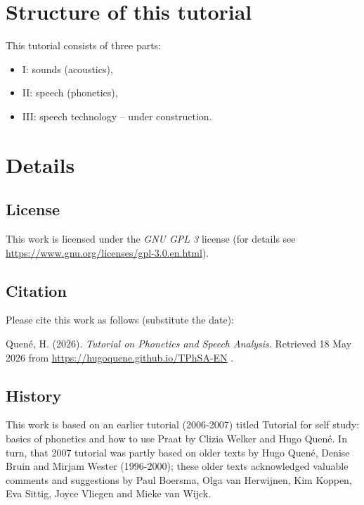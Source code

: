 \documentclass[
]{book}
\begin{document}
\section*{Structure of this tutorial}\label{structure-of-this-tutorial}

This tutorial consists of three parts:

\begin{itemize}
\item
  I: sounds (acoustics),
\item
  II: speech (phonetics),
\item
  III: speech technology -- under construction.
\end{itemize}

\section*{Details}\label{details}

\subsection*{License}\label{license}

This work is licensed under the \emph{GNU GPL 3} license (for details see
\url{https://www.gnu.org/licenses/gpl-3.0.en.html}).

\subsection*{Citation}\label{citation}

Please cite this work as follows (substitute the date):

Quené, H. (2026). \emph{Tutorial on Phonetics and Speech Analysis}. Retrieved 18 May 2026 from \url{https://hugoquene.github.io/TPhSA-EN} .

\subsection*{History}\label{history}

This work is based on an earlier tutorial (2006-2007) titled Tutorial for self study: basics of phonetics and how to use Praat by Clizia Welker and Hugo Quené. In turn, that 2007 tutorial was partly based on older texts by Hugo Quené, Denise Bruin and Mirjam Wester (1996-2000); these older texts acknowledged valuable comments and suggestions by Paul Boersma, Olga van Herwijnen, Kim Koppen, Eva Sittig, Joyce Vliegen and Mieke van Wijck.
\end{document}
